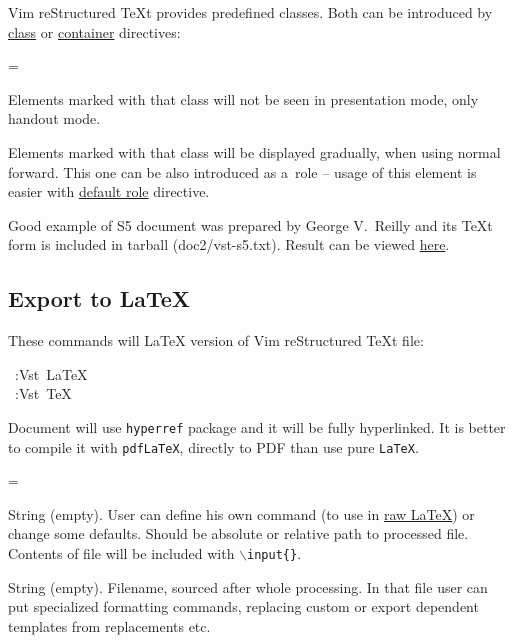 \documentclass[12pt]{article}
\newenvironment{deflist}[1]{%
\begin{list}{}
{\renewcommand{\makelabel}[1]{\textbf{##1}\hfill}
\settowidth{\labelwidth}{\textbf{#1}}
\leftmargin=\labelwidth
\advance \leftmargin\labelsep}}
{\end{list}}
\begin{document}
Vim reStructured \TeX{}t provides predefined classes. Both can be introduced by \href{\#lclass}{class} or
\href{\#lcontainer}{container} directives:

\begin{deflist}{iii}

\item[\texttt{handout} ]

Elements marked with that class will not be seen in presentation mode,
only handout mode.

\item[\texttt{incremental}]

Elements marked with that class will be displayed gradually, when using
normal forward. This one can be also introduced as a~role -- usage of this
element is easier with \href{\#ldefault-role}{default role} directive.
\end{deflist}

Good example of S5 document was prepared by George V.~Reilly and its \TeX{}t
form is included in tarball (doc2/vst-s5.txt). Result can be viewed \href{http://skawina.eu.org/mikolaj/vst-s5.html}{here}.

\hypertarget{lexport-to-LaTeX}{}
\subsection{Export to \LaTeX{}}

These commands will \LaTeX{} version of Vim reStructured \TeX{}t file:

\begin{ttfamily}\begin{flushleft}
\mbox{~:Vst~\LaTeX{}}\\
\mbox{~:Vst~\TeX{}}\\
\end{flushleft}\end{ttfamily}

Document will use \texttt{hyperref} package and it will be fully hyperlinked.
It is better to compile it with \texttt{pdf\LaTeX{}}, directly to PDF than use
pure \texttt{\LaTeX{}}.

\hypertarget{lvtp}{}

\begin{deflist}{iii}

\item[\texttt{g:vst\_\TeX{}\_preamble}]

String (empty). User can define his own command (to use in
\href{\#lraw-LaTeX}{raw \LaTeX{}}) or change some defaults. Should be absolute or relative
path to processed file. Contents of file will be included with
\texttt{$\backslash$input\{\}}.

\item[\texttt{g:vst\_\TeX{}\_post}]

String (empty). Filename, sourced after whole processing. In that file
user can put specialized formatting commands, replacing custom or export
dependent templates from replacements etc.
\end{deflist}
\end{document}
